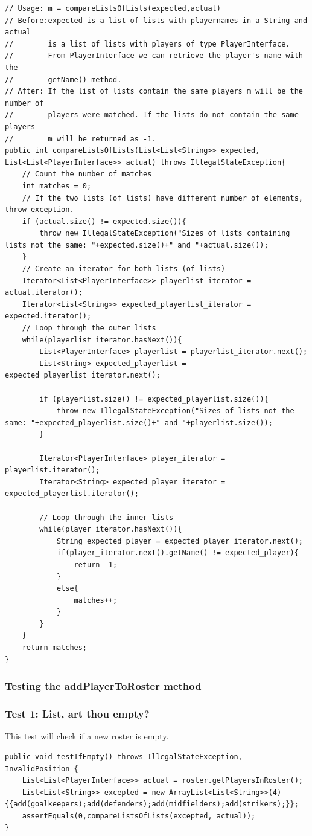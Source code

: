 \documentclass{article}
\begin{document}
\begin{lstlisting}
// Usage: m = compareListsOfLists(expected,actual)
// Before:expected is a list of lists with playernames in a String and actual
//        is a list of lists with players of type PlayerInterface.
//        From PlayerInterface we can retrieve the player's name with the
//        getName() method.
// After: If the list of lists contain the same players m will be the number of
//        players were matched. If the lists do not contain the same players
//        m will be returned as -1.
public int compareListsOfLists(List<List<String>> expected, List<List<PlayerInterface>> actual) throws IllegalStateException{
	// Count the number of matches
	int matches = 0;
	// If the two lists (of lists) have different number of elements, throw exception.
	if (actual.size() != expected.size()){
		throw new IllegalStateException("Sizes of lists containing lists not the same: "+expected.size()+" and "+actual.size());
	}
	// Create an iterator for both lists (of lists)
	Iterator<List<PlayerInterface>> playerlist_iterator = actual.iterator();
	Iterator<List<String>> expected_playerlist_iterator = expected.iterator();
	// Loop through the outer lists
	while(playerlist_iterator.hasNext()){
		List<PlayerInterface> playerlist = playerlist_iterator.next();
		List<String> expected_playerlist = expected_playerlist_iterator.next();
		
		if (playerlist.size() != expected_playerlist.size()){
			throw new IllegalStateException("Sizes of lists not the same: "+expected_playerlist.size()+" and "+playerlist.size());
		}
		
		Iterator<PlayerInterface> player_iterator = playerlist.iterator();
		Iterator<String> expected_player_iterator = expected_playerlist.iterator();
		
		// Loop through the inner lists
		while(player_iterator.hasNext()){
			String expected_player = expected_player_iterator.next();
			if(player_iterator.next().getName() != expected_player){
				return -1;
			}
			else{
				matches++;
			}
		}
	}
	return matches;
}
\end{lstlisting}

\subsubsection{Testing the addPlayerToRoster method}
\subsubsection*{Test 1: List, art thou empty?}
This test will check if a new roster is empty.
\begin{lstlisting}
public void testIfEmpty() throws IllegalStateException, InvalidPosition {
	List<List<PlayerInterface>> actual = roster.getPlayersInRoster();
	List<List<String>> excepted = new ArrayList<List<String>>(4) {{add(goalkeepers);add(defenders);add(midfielders);add(strikers);}};
	assertEquals(0,compareListsOfLists(excepted, actual));
}
\end{lstlisting}
\end{document}

